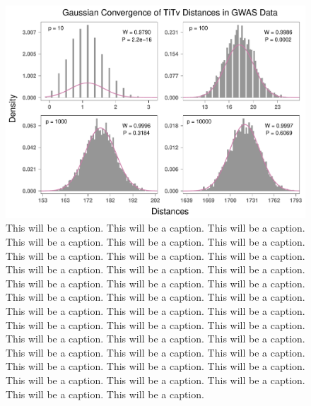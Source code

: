 \documentclass[10pt,letterpaper]{article}\usepackage[]{graphicx}\usepackage[]{color}
\begin{document}
\begin{figure}[H]
	\includegraphics[width=\textwidth]{central_limit_hist_gwas_TiTv.pdf}
	\caption{This will be a caption. This will be a caption. This will be a caption. This will be a caption. This will be a caption. This will be a caption. This will be a caption. This will be a caption. This will be a caption. This will be a caption. This will be a caption. This will be a caption. This will be a caption. This will be a caption. This will be a caption. This will be a caption. This will be a caption. This will be a caption. This will be a caption. This will be a caption. This will be a caption. This will be a caption. This will be a caption. This will be a caption. This will be a caption. This will be a caption. This will be a caption. This will be a caption. This will be a caption. This will be a caption. This will be a caption. This will be a caption. This will be a caption. This will be a caption. This will be a caption. This will be a caption. This will be a caption. This will be a caption.}
\end{figure}
\end{document}
